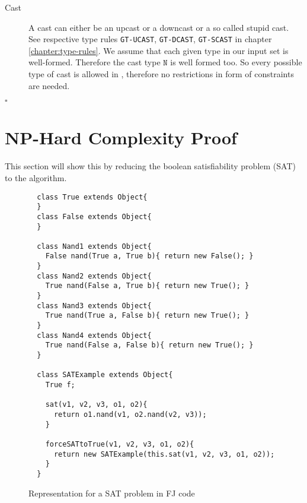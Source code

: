 \begin{description}
\item[Cast]
A cast can either be an upcast or a downcast or a so called stupid cast.
See respective type rules \texttt{GT-UCAST}, \texttt{GT-DCAST}, \texttt{GT-SCAST} in chapter \ref{chapter:type-rules}.
We assume that each given type in our input set is well-formed.
Therefore the cast type $\mathtt{N}$ is well formed too.
So every possible type of cast is allowed in \TFGJ, therefore no restrictions in form of constraints are needed.

\end{description}

\hfill $\square$

\section{NP-Hard Complexity Proof}\label{section:np-hard}
This section will show this by reducing the boolean satisfiability problem (SAT) to the \fjtypeinference{} algorithm.

\begin{figure}
\begin{lstlisting}
  class True extends Object{
  }
  class False extends Object{
  }

  class Nand1 extends Object{
    False nand(True a, True b){ return new False(); }
  }
  class Nand2 extends Object{
    True nand(False a, True b){ return new True(); }
  }
  class Nand3 extends Object{
    True nand(True a, False b){ return new True(); }
  }
  class Nand4 extends Object{
    True nand(False a, False b){ return new True(); }
  }

  class SATExample extends Object{
    True f;

    sat(v1, v2, v3, o1, o2){
      return o1.nand(v1, o2.nand(v2, v3));
    }

    forceSATtoTrue(v1, v2, v3, o1, o2){
      return new SATExample(this.sat(v1, v2, v3, o1, o2));
    }
  }
\end{lstlisting}

\caption{Representation for a SAT problem in FJ code}
\label{fig:fjSATcode}
\end{figure}

